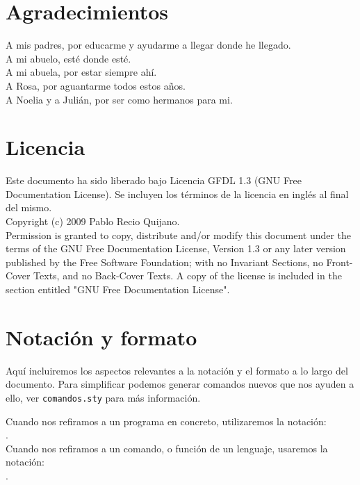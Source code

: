 

\section*{Agradecimientos}

A mis padres, por educarme y ayudarme a llegar donde he llegado.\\
A mi abuelo, esté donde esté.\\
A mi abuela, por estar siempre ahí.\\
A Rosa, por aguantarme todos estos años.\\
A Noelia y a Julián, por ser como hermanos para mi.

\cleardoublepage

\section*{Licencia} %

Este documento ha sido liberado bajo Licencia GFDL 1.3 (GNU Free
Documentation License). Se incluyen los términos de la licencia en
inglés al final del mismo.\\

Copyright (c) 2009 Pablo Recio Quijano.\\

Permission is granted to copy, distribute and/or modify this document under the
terms of the GNU Free Documentation License, Version 1.3 or any later version
published by the Free Software Foundation; with no Invariant Sections, no
Front-Cover Texts, and no Back-Cover Texts. A copy of the license is included in
the section entitled "GNU Free Documentation License".\\

\cleardoublepage

\section*{Notación y formato}

Aquí incluiremos los aspectos relevantes a la notación y el formato a
lo largo del documento. Para simplificar podemos generar comandos
nuevos que nos ayuden a ello, ver \texttt{comandos.sty} para más
información. 

Cuando nos refiramos a un programa en concreto, utilizaremos la
notación: \\ .\\

Cuando nos refiramos a un comando, o función de un lenguaje, usaremos
la notación: \\ .\\